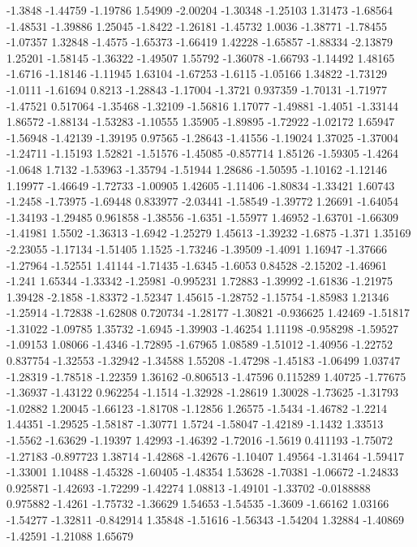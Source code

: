 \documentclass[9pt]{article}
\theoremstyle{plain}
\theoremstyle{definition}
\theoremstyle{remark}
\numberwithin{equation}{section}
\begin{document}
-1.3848
-1.44759
-1.19786
1.54909
-2.00204
-1.30348
-1.25103
1.31473
-1.68564
-1.48531
-1.39886
1.25045
-1.8422
-1.26181
-1.45732
1.0036
-1.38771
-1.78455
-1.07357
1.32848
-1.4575
-1.65373
-1.66419
1.42228
-1.65857
-1.88334
-2.13879
1.25201
-1.58145
-1.36322
-1.49507
1.55792
-1.36078
-1.66793
-1.14492
1.48165
-1.6716
-1.18146
-1.11945
1.63104
-1.67253
-1.6115
-1.05166
1.34822
-1.73129
-1.0111
-1.61694
0.8213
-1.28843
-1.17004
-1.3721
0.937359
-1.70131
-1.71977
-1.47521
0.517064
-1.35468
-1.32109
-1.56816
1.17077
-1.49881
-1.4051
-1.33144
1.86572
-1.88134
-1.53283
-1.10555
1.35905
-1.89895
-1.72922
-1.02172
1.65947
-1.56948
-1.42139
-1.39195
0.97565
-1.28643
-1.41556
-1.19024
1.37025
-1.37004
-1.24711
-1.15193
1.52821
-1.51576
-1.45085
-0.857714
1.85126
-1.59305
-1.4264
-1.0648
1.7132
-1.53963
-1.35794
-1.51944
1.28686
-1.50595
-1.10162
-1.12146
1.19977
-1.46649
-1.72733
-1.00905
1.42605
-1.11406
-1.80834
-1.33421
1.60743
-1.2458
-1.73975
-1.69448
0.833977
-2.03441
-1.58549
-1.39772
1.26691
-1.64054
-1.34193
-1.29485
0.961858
-1.38556
-1.6351
-1.55977
1.46952
-1.63701
-1.66309
-1.41981
1.5502
-1.36313
-1.6942
-1.25279
1.45613
-1.39232
-1.6875
-1.371
1.35169
-2.23055
-1.17134
-1.51405
1.1525
-1.73246
-1.39509
-1.4091
1.16947
-1.37666
-1.27964
-1.52551
1.41144
-1.71435
-1.6345
-1.6053
0.84528
-2.15202
-1.46961
-1.241
1.65344
-1.33342
-1.25981
-0.995231
1.72883
-1.39992
-1.61836
-1.21975
1.39428
-2.1858
-1.83372
-1.52347
1.45615
-1.28752
-1.15754
-1.85983
1.21346
-1.25914
-1.72838
-1.62808
0.720734
-1.28177
-1.30821
-0.936625
1.42469
-1.51817
-1.31022
-1.09785
1.35732
-1.6945
-1.39903
-1.46254
1.11198
-0.958298
-1.59527
-1.09153
1.08066
-1.4346
-1.72895
-1.67965
1.08589
-1.51012
-1.40956
-1.22752
0.837754
-1.32553
-1.32942
-1.34588
1.55208
-1.47298
-1.45183
-1.06499
1.03747
-1.28319
-1.78518
-1.22359
1.36162
-0.806513
-1.47596
0.115289
1.40725
-1.77675
-1.36937
-1.43122
0.962254
-1.1514
-1.32928
-1.28619
1.30028
-1.73625
-1.31793
-1.02882
1.20045
-1.66123
-1.81708
-1.12856
1.26575
-1.5434
-1.46782
-1.2214
1.44351
-1.29525
-1.58187
-1.30771
1.5724
-1.58047
-1.42189
-1.1432
1.33513
-1.5562
-1.63629
-1.19397
1.42993
-1.46392
-1.72016
-1.5619
0.411193
-1.75072
-1.27183
-0.897723
1.38714
-1.42868
-1.42676
-1.10407
1.49564
-1.31464
-1.59417
-1.33001
1.10488
-1.45328
-1.60405
-1.48354
1.53628
-1.70381
-1.06672
-1.24833
0.925871
-1.42693
-1.72299
-1.42274
1.08813
-1.49101
-1.33702
-0.0188888
0.975882
-1.4261
-1.75732
-1.36629
1.54653
-1.54535
-1.3609
-1.66162
1.03166
-1.54277
-1.32811
-0.842914
1.35848
-1.51616
-1.56343
-1.54204
1.32884
-1.40869
-1.42591
-1.21088
1.65679
\end{document}

